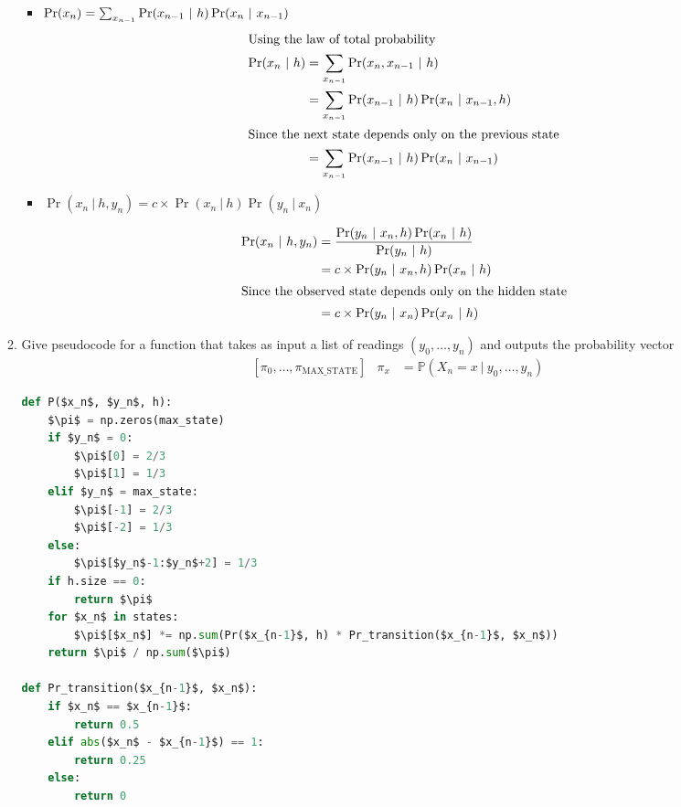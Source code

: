 \documentclass[10pt,\jkfside,a4paper]{article}
\begin{document}
\begin{enumerate}
\begin{enumerate}[label=(\alph*)]
\begin{itemize}
\item $\Pr(x_n) = \sum^{}_{x_{n-1}} \Pr(x_{n-1} \ | \ h) \Pr(x_n \ | \ x_{n-1}) \\$
\begin{align*}
\intertext{Using the law of total probability}
\Pr(x_n \ | \ h )
&= \sum_{x_{n-1}} \Pr(x_n, x_{n-1} \ | \ h) \\
&= \sum_{x_{n-1}} \Pr(x_{n-1} \ | \ h) \Pr(x_n \ | \
x_{n-1}, h) \\
\intertext{Since the next state depends only on the previous state}
&= \sum_{x_{n-1}} \Pr(x_{n-1} \ | \ h) \Pr(x_n \ | \ x_{n-1}) \\
\end{align*}

\item $\Pr(x_n \ | \ h, y_n) = c \times \Pr(x_n \ | \ h) \Pr(y_n \ | \ x_n) $

\begin{align*}
\Pr(x_n \ | \ h, y_n)
&= \frac{\Pr(y_n \ | \ x_n, h)\Pr(x_n \ | \ h)}{\Pr(y_n \ | \ h)} \\
&= c \times \Pr(y_n \ | \ x_n, h)\Pr(x_n \ | \ h) \\
\intertext{Since the observed state depends only on the hidden state}
&= c \times \Pr(y_n \ | \ x_n)\Pr(x_n \ | \ h) \\
\end{align*}

\end{itemize}

\item Give pseudocode for a function that takes as input a list of readings
$(y_0, \dots, y_n)$ and outputs the probability vector
\begin{align*}
& [\pi_0, \dots, \pi_{\text{MAX\_STATE}}]
&
\pi_x &= \mathbb{P}(X_n = x \ | \ y_0, \dots, y_n)
\end{align*}

\begin{lstlisting}[language=Python, mathescape=true]
def P($x_n$, $y_n$, h):
	$\pi$ = np.zeros(max_state)
	if $y_n$ = 0:
		$\pi$[0] = 2/3
		$\pi$[1] = 1/3
	elif $y_n$ = max_state:
		$\pi$[-1] = 2/3
		$\pi$[-2] = 1/3
	else:
		$\pi$[$y_n$-1:$y_n$+2] = 1/3
	if h.size == 0:
		return $\pi$
	for $x_n$ in states:
		$\pi$[$x_n$] *= np.sum(Pr($x_{n-1}$, h) * Pr_transition($x_{n-1}$, $x_n$))
	return $\pi$ / np.sum($\pi$)

def Pr_transition($x_{n-1}$, $x_n$):
	if $x_n$ == $x_{n-1}$:
		return 0.5
	elif abs($x_n$ - $x_{n-1}$) == 1:
		return 0.25
	else:
		return 0
\end{lstlisting}


\end{enumerate}
\end{enumerate}
\end{document}
